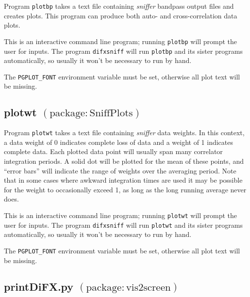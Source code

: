 Program {\tt plotbp} takes a text file containing {\em sniffer} bandpass output files and creates plots.
This program can produce both auto- and cross-correlation data plots.

This is an interactive command line program; running {\tt plotbp} will prompt the user for inputs.
The program {\tt difxsniff} will run {\tt plotbp} and its sister programs automatically, so usually it won't be necessary to run by hand.

The {\tt PGPLOT\_FONT} environment variable must be set, otherwise all plot text will be missing.






\subsection{plotwt {\small $\mathrm{(package: SniffPlots)}$} \label{sec:plotwt}}

Program {\tt plotwt} takes a text file containing {\em sniffer} data weights.
In this context, a data weight of 0 indicates complete loss of data and a weight of 1 indicates complete data.
Each plotted data point will usually span many correlator integration periods.
A solid dot will be plotted for the mean of these points, and ``error bars'' will indicate the range of weights over the averaging period.
Note that in some cases where awkward integration times are used it may be possible for the weight to occasionally exceed 1, as long as the long running average never does.

This is an interactive command line program; running {\tt plotwt} will prompt the user for inputs.
The program {\tt difxsniff} will run {\tt plotwt} and its sister programs automatically, so usually it won't be necessary to run by hand.

The {\tt PGPLOT\_FONT} environment variable must be set, otherwise all plot text will be missing.








\subsection{printDiFX.py {\small $\mathrm{(package: vis2screen)}$} \label{sec:printDiFX}}

